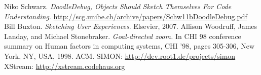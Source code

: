 \documentclass[a4paper,ngerman,english]{amsbook} %
\begin{document}
\renewcommand\bibname{References} %
\begin{thebibliography}{99}
Niko Schwarz. \emph{DoodleDebug, Objects Should Sketch Themselves For Code Understanding}. \url{http://scg.unibe.ch/archive/papers/Schw11bDoodleDebug.pdf}
Bill Buxton. \emph{Sketching User Experiences}. Elsevier, 2007.
Allison Woodruff, James Landay, and Michael Stonebraker. \emph{Goal-directed zoom.} In CHI 98 conference summary on Human factors in computing systems, CHI '98, pages 305-306, New York, NY, USA, 1998. ACM.
SIMON: \url{http://dev.root1.de/projects/simon}
XStream: \url{http://xstream.codehaus.org}
\end{thebibliography}
\end{document}
